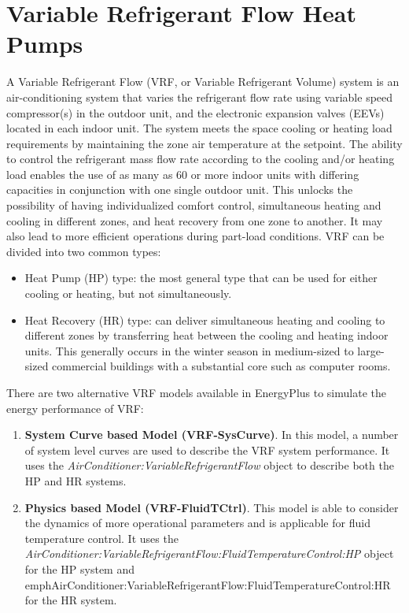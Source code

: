 \section{Variable Refrigerant Flow Heat Pumps }\label{variable-refrigerant-flow-heat-pumps}

A Variable Refrigerant Flow (VRF, or Variable Refrigerant Volume) system is an air-conditioning system that varies the refrigerant flow rate using variable speed compressor(s) in the outdoor unit, and the electronic expansion valves (EEVs) located in each indoor unit. The system meets the space cooling or heating load requirements by maintaining the zone air temperature at the setpoint. The ability to control the refrigerant mass flow rate according to the cooling and/or heating load enables the use of as many as 60 or more indoor units with differing capacities in conjunction with one single outdoor unit. This unlocks the possibility of having individualized comfort control, simultaneous heating and cooling in different zones, and heat recovery from one zone to another. It may also lead to more efficient operations during part-load conditions. VRF can be divided into two common types:

\begin{itemize}
\item
  Heat Pump (HP) type: the most general type that can be used for either cooling or heating, but not simultaneously.
\item
  Heat Recovery (HR) type: can deliver simultaneous heating and cooling to different zones by transferring heat between the cooling and heating indoor units. This generally occurs in the winter season in medium-sized to large-sized commercial buildings with a substantial core such as computer rooms.
\end{itemize}

There are two alternative VRF models available in EnergyPlus to simulate the energy performance of VRF:

\begin{enumerate}
\def\labelenumi{\arabic{enumi}.}
\item
  \textbf{System Curve based Model (VRF-SysCurve)}. In this model, a number of system level curves are used to describe the VRF system performance. It uses the \emph{AirConditioner:VariableRefrigerantFlow} object to describe both the HP and HR systems.
\item
  \textbf{Physics based Model (VRF-FluidTCtrl)}. This model is able to consider the dynamics of more operational parameters and is applicable for fluid temperature control. It uses the \emph{AirConditioner:VariableRefrigerantFlow:FluidTemperatureControl:HP} object for the HP system and emph{AirConditioner:VariableRefrigerantFlow:FluidTemperatureControl:HR} for the HR system.
\end{enumerate}


